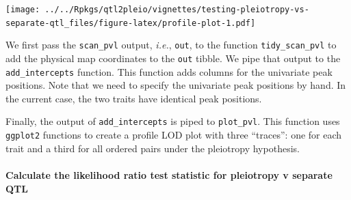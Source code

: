 \documentclass[oneside]{book}\usepackage[]{graphicx}\usepackage[]{color}
\newenvironment{Shaded}{\begin{snugshade}}{\end{snugshade}}
\newcommand{\CommentTok}[1]{\textcolor[rgb]{0.56,0.35,0.01}{\textit{#1}}}
\newcommand{\DataTypeTok}[1]{\textcolor[rgb]{0.13,0.29,0.53}{#1}}
\newcommand{\FloatTok}[1]{\textcolor[rgb]{0.00,0.00,0.81}{#1}}
\newcommand{\KeywordTok}[1]{\textcolor[rgb]{0.13,0.29,0.53}{\textbf{#1}}}
\newcommand{\NormalTok}[1]{#1}
\newcommand{\OperatorTok}[1]{\textcolor[rgb]{0.81,0.36,0.00}{\textbf{#1}}}
\newcommand{\StringTok}[1]{\textcolor[rgb]{0.31,0.60,0.02}{#1}}
\begin{document}
\begin{Shaded}
\end{Shaded}

\texttt{[image: ../../Rpkgs/qtl2pleio/vignettes/testing-pleiotropy-vs-separate-qtl\_files/figure-latex/profile-plot-1.pdf]}

We first pass the \texttt{scan\_pvl} output, \emph{i.e.}, \texttt{out},
to the function \texttt{tidy\_scan\_pvl} to add the physical map
coordinates to the \texttt{out} tibble. We pipe that output to the
\texttt{add\_intercepts} function. This function adds columns for the
univariate peak positions. Note that we need to specify the univariate
peak positions by hand. In the current case, the two traits have
identical peak positions.

Finally, the output of \texttt{add\_intercepts} is piped to
\texttt{plot\_pvl}. This function uses \texttt{ggplot2} functions to
create a profile LOD plot with three ``traces'': one for each trait and
a third for all ordered pairs under the pleiotropy hypothesis.

\hypertarget{calculate-the-likelihood-ratio-test-statistic-for-pleiotropy-v-separate-qtl}{%
\paragraph{Calculate the likelihood ratio test statistic for pleiotropy
v separate
QTL}\label{calculate-the-likelihood-ratio-test-statistic-for-pleiotropy-v-separate-qtl}}
\end{document}
